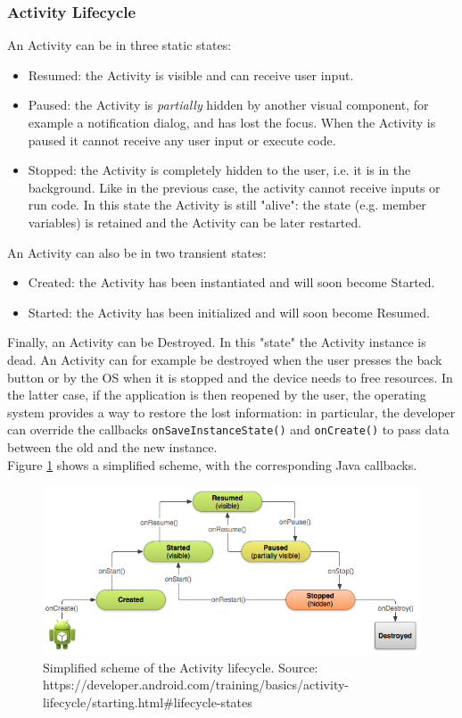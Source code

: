 \documentclass[11pt,a4paper,notitlepage]{article}
\begin{document}
\subsubsection{Activity Lifecycle}
An Activity can be in three static states:
\begin{itemize}
	\item Resumed: the Activity is visible and can receive user input.
	\item Paused: the Activity is \textit{partially} hidden by another visual component, for example a notification dialog, and has lost the focus. When the Activity is paused it cannot receive any user input or execute code.
	\item Stopped: the Activity is completely hidden to the user, i.e. it is in the background. Like in the previous case, the activity cannot receive inputs or run code. In this state the Activity is still "alive": the state (e.g. member variables) is retained and the Activity can be later restarted.
\end{itemize}\medskip
An Activity can also be in two transient states:
\begin{itemize}
	\item Created: the Activity has been instantiated and will soon become Started.
	\item Started: the Activity has been initialized and will soon become Resumed.
\end{itemize}\medskip
Finally, an Activity can be Destroyed. In this "state" the Activity instance is dead. An Activity can for example be destroyed when the user presses the back button or by the OS when it is stopped and the device needs to free resources. In the latter case, if the application is then reopened by the user, the operating system provides a way to restore the lost information: in particular, the developer can override the callbacks \texttt{onSaveInstanceState()} and \texttt{onCreate()} to pass data between the old and the new instance.\bigskip \\
Figure \ref{fig:act_lifec} shows a simplified scheme, with the corresponding Java callbacks.
\begin{figure}
  \centering
  \includegraphics[width=\textwidth]{Images/Android/basic-lifecycle.png}
  \caption[Activity lifecycle]{Simplified scheme of the Activity lifecycle. Source: https://developer.android.com/training/basics/activity-lifecycle/starting.html\#lifecycle-states}
  \label{fig:act_lifec}
\end{figure}
\end{document}
